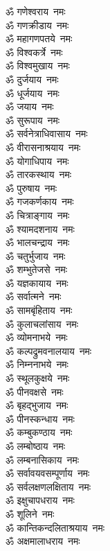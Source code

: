 \begin{multicols}{2}
\begin{flushleft}
ॐ गणेश्वराय~नमः\\
ॐ गणक्रीडाय~नमः\\
ॐ महागणपतये~नमः\\
ॐ विश्वकर्त्रे~नमः\\
ॐ विश्वमुखाय~नमः\\
ॐ दुर्जयाय~नमः\\
ॐ धूर्जयाय~नमः\\
ॐ जयाय~नमः\\
ॐ सुरूपाय~नमः\\
ॐ सर्वनेत्राधिवासाय~नमः\hfill{}\\
ॐ वीरासनाश्रयाय~नमः\\
ॐ योगाधिपाय~नमः\\
ॐ तारकस्थाय~नमः\\
ॐ पुरुषाय~नमः\\
ॐ गजकर्णकाय~नमः\\
ॐ चित्राङ्गाय~नमः\\
ॐ श्यामदशनाय~नमः\\
ॐ भालचन्द्राय~नमः\\
ॐ चतुर्भुजाय~नमः\\
ॐ शम्भुतेजसे~नमः\hfill{}\\
ॐ यज्ञकायाय~नमः\\
ॐ सर्वात्मने~नमः\\
ॐ सामबृंहिताय~नमः\\
ॐ कुलाचलांसाय~नमः\\
ॐ व्योमनाभये~नमः\\
ॐ कल्पद्रुमवनालयाय~नमः\\
ॐ निम्ननाभये~नमः\\
ॐ स्थूलकुक्षये~नमः\\
ॐ पीनवक्षसे~नमः\\
ॐ बृहद्भुजाय~नमः\hfill{}\\
ॐ पीनस्कन्धाय~नमः\\
ॐ कम्बुकण्ठाय~नमः\\
ॐ लम्बोष्ठाय~नमः\\
ॐ लम्बनासिकाय~नमः\\
ॐ सर्वावयवसम्पूर्णाय~नमः\\
ॐ सर्वलक्षणलक्षिताय~नमः\\
ॐ इक्षुचापधराय~नमः\\
ॐ शूलिने~नमः\\
ॐ कान्तिकन्दलिताश्रयाय~नमः\\
ॐ अक्षमालाधराय~नमः\hfill{}\\

\end{flushleft}
\end{multicols}
